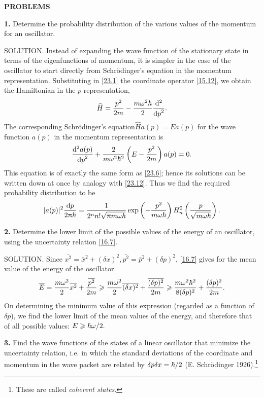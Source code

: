 {\small
\textbf{PROBLEMS}


\textbf{1.} Determine the probability distribution of the various values of the momentum for an oscillator.





SOLUTION. Instead of expanding the wave function of the stationary state in terms of the eigenfunctions of momentum, it is simpler in the case of the oscillator to start directly from Schr\"odinger's equation in the momentum representation. Substituting in \eqref{23.1} the coordinate operator \eqref{15.12}, we obtain the Hamiltonian in the $ p $ representation,
\[ \widehat{H}=\frac{p^2}{2m}-\frac{m\omega^2\hbar}{2}\frac{\mathrm{d}^2}{{\mathrm{d} p}^2}. \]
The corresponding Schr\"odinger's equation$  \hat{H}a (p) = Ea (p) $ for the wave function $ a (p) $ in the momentum representation is
\[ \frac{\mathrm{d}^2 a(p)}{{\mathrm{d} p}^2}+\frac{2}{m\omega^2\hbar^2}\left( E-\frac{p^2}{2m}\right)a(p)=0. \]
This equation is of exactly the same form as \eqref{23.6}; hence its solutions can be written down at once by analogy with \eqref{23.12}. Thus we find the required probability distribution to be
\[ |a(p)|^2\frac{\mathrm{d} p}{2\uppi\hbar}=\frac{1}{2^nn!\sqrt{\uppi m\omega\hbar}}\exp\left(-\frac{p^2}{m\omega\hbar} \right)H_n^2\left( \frac{p}{\sqrt{m\omega\hbar}}\right) .\]




\textbf{2.} Determine the lower limit of the possible values of the energy of an oscillator, using the uncertainty relation \eqref{16.7}.





SOLUTION. Since $ \bar{x^2}=\bar{x}^2+(\delta x)^2 ,\bar{p^2}=\bar{p}^2+(\delta p)^2$, \eqref{16.7} gives for the mean value of the energy of the oscillator
\[ \overline{E}=\frac{m\omega^2}{2}\overline{x^2}+\frac{\overline{p^2}}{2m}\geqslant\frac{m\omega^2}{2}\overline{(\delta x)^2}+\frac{\overline{(\delta p)^2}}{2m}\geqslant\frac{m\omega^2\hbar^2}{8(\delta p)^2}+\frac{(\delta p)^2}{2m}. \]
On determining the minimum value of this expression (regarded as a function of $\delta p$), we find the lower limit of the mean values of the energy, and therefore that of all possible values: $ E\geqslant\hbar\omega/2. $




\textbf{3.} Find the wave functions of the states of a linear oscillator that minimize the uncertainty relation, i.e. in which the standard deviations of the coordinate and momentum in the wave packet are related by $  \delta p \delta x = \hbar/2 $ (E. Schr\"odinger 1926).\footnote{These are called \textit{coherent states}.}





}

